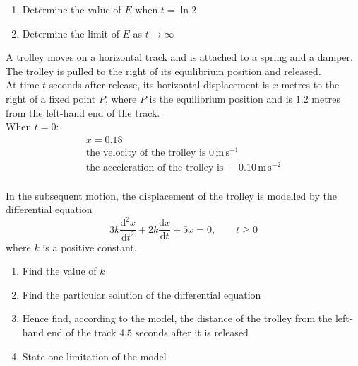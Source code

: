 \documentclass[leqno]{article}
\begin{document}
\begin{enumerate}[
  label=\textbf{\arabic*.},
  leftmargin=*,
  topsep=0pt,
  partopsep=0pt,
  parsep=0pt
]
\begin{enumerate}[label=\textbf{(\alph*)}]
  \item Determine the value of $E$ when $t=\ln 2$  \\
  \item Determine the limit of $E$ as $t\to\infty$  \\
\end{enumerate}

\newpage

\questionitem

A trolley moves on a horizontal track and is attached to a spring and a damper. The trolley is pulled to the right of its equilibrium position and released. \\

At time $t$ seconds after release, its horizontal displacement is $x$ metres to the right of a fixed point $P$, where $P$ is the equilibrium position and is $1.2$ metres from the left-hand end of the track. \\

When $t=0$:
\[
\renewcommand{\arraystretch}{1.2}
\begin{array}{l}
x=0.18\\
\text{the velocity of the trolley is }0\,\mathrm{m\,s^{-1}}\\
\text{the acceleration of the trolley is }-0.10\,\mathrm{m\,s^{-2}}
\end{array}
\] \\
In the subsequent motion, the displacement of the trolley is modelled by the differential equation
\[
3k\frac{\mathrm{d}^2 x}{\mathrm{d} t^2}+2k\frac{\mathrm{d} x}{\mathrm{d} t}+5x=0,\qquad t\ge 0
\]
where $k$ is a positive constant. \\

\begin{enumerate}[label=\textbf{(\alph*)}]
  \item Find the value of $k$  \\
  \item Find the particular solution of the differential equation  \\
  \item Hence find, according to the model, the distance of the trolley from the left-hand end of the track $4.5$ seconds after it is released  \\
  \item State one limitation of the model  \\
\end{enumerate}


\end{enumerate}
\end{document}
